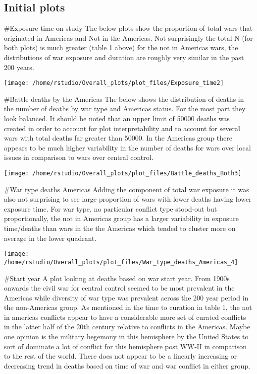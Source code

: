 \documentclass[
]{article}
\begin{document}
\hypertarget{initial-plots}{%
\subsection{Initial plots}\label{initial-plots}}

\#Exposure time on study The below plots show the proportion of total
wars that originated in Americas and Not in the Americas. Not
surprisingly the total N (for both plots) is much greater (table 1
above) for the not in Americas wars, the distributions of war exposure
and duration are roughly very similar in the past 200 years.

\texttt{[image: /home/rstudio/Overall\_plots/plot\_files/Exposure\_time2]}

\#Battle deaths by the Americas The below shows the distribution of
deaths in the number of deaths by war type and Americas status. For the
most part they look balanced. It should be noted that an upper limit of
50000 deaths was created in order to account for plot interpretability
and to account for several wars with total deaths far greater than
50000. In the Americas group there appears to be much higher variability
in the number of deaths for wars over local issues in comparison to wars
over central control.

\texttt{[image: /home/rstudio/Overall\_plots/plot\_files/Battle\_deaths\_Both3]}

\#War type deaths Americas Adding the component of total war exposure it
was also not surprising to see large proportion of wars with lower
deaths having lower exposure time. For war type, no particular conflict
type stood-out but proportionally, the not in Americas group has a
larger variability in exposure time/deaths than wars in the the Americas
which tended to cluster more on average in the lower quadrant.

\texttt{[image: /home/rstudio/Overall\_plots/plot\_files/War\_type\_deaths\_Americas\_4]}

\#Start year A plot looking at deaths based on war start year. From
1900s onwards the civil war for central control seemed to be most
prevalent in the Americas while diversity of war type was prevalent
across the 200 year period in the non-Americas group. As mentioned in
the time to curation in table 1, the not in americas conflicts appear to
have a considerable more set of curated conflicts in the latter half of
the 20th century relative to conflicts in the Americas. Maybe one
opinion is the military hegemony in this hemisphere by the United States
to sort of dominate a lot of conflict for this hemisphere post WW-II in
comparison to the rest of the world. There does not appear to be a
linearly increasing or decreasing trend in deaths based on time of war
and war conflict in either group.
\end{document}
